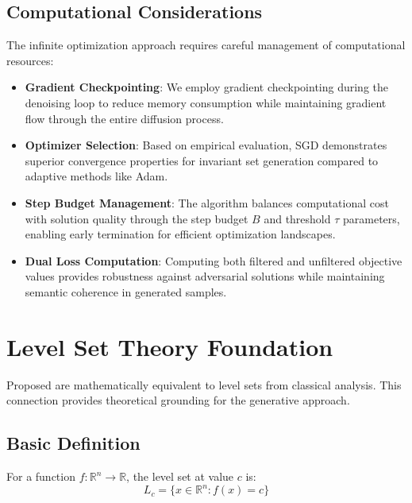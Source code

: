 \subsection{Computational Considerations}

The infinite optimization approach requires careful management of computational resources:

\begin{itemize}
    \item \textbf{Gradient Checkpointing}: We employ gradient checkpointing during the denoising loop to reduce memory consumption while maintaining gradient flow through the entire diffusion process.
    
    \item \textbf{Optimizer Selection}: Based on empirical evaluation, SGD demonstrates superior convergence properties for invariant set generation compared to adaptive methods like Adam.
    
    \item \textbf{Step Budget Management}: The algorithm balances computational cost with solution quality through the step budget $B$ and threshold $\tau$ parameters, enabling early termination for efficient optimization landscapes.
    
    \item \textbf{Dual Loss Computation}: Computing both filtered and unfiltered objective values provides robustness against adversarial solutions while maintaining semantic coherence in generated samples.
\end{itemize}

\section{Level Set Theory Foundation}\label{appendix:level_sets}

Proposed \framework{} are mathematically equivalent to level sets from classical analysis. This connection provides theoretical grounding for the generative approach.

\subsection{Basic Definition}

For a function $f: \mathbb{R}^n \rightarrow \mathbb{R}$, the level set at value $c$ is:
\begin{equation}
L_c = \{x \in \mathbb{R}^n : f(x) = c\}
\end{equation}

